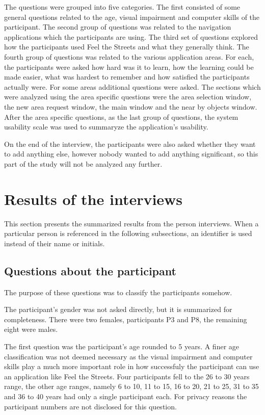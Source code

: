 \documentclass[nolof,digital]{fithesis3}
\begin{document}
The questions were grouped into five categories. The first consisted of some general questions related to the age, visual impairment and computer skills of the participant. The second group of questions was related to the navigation applications which the participants are using. The third set of questions explored how the participants used Feel the Streets and what they generally think. The fourth group of questions was related to the various application areas. For each, the participants were asked how hard was it to learn, how the learning could be made easier, what was hardest to remember and how satisfied the participants actually were. For some areas additional questions were asked. The sections which were analyzed using the area specific questions were the area selection window, the new area request window, the main window and the near by objects window. After the area specific questions, as the last group of questions, the system usability scale \parencite{brooke1996} was used to summaryze the application's usability.

On the end of the interview, the participants were also asked whether they want to add anything else, however nobody wanted to add anything significant, so this part of the study will not be analyzed any further.
\section{Results of the interviews}
This section presents the summarized results from the person interviews. When a particular person is referenced in the following subsections, an identifier is used instead of their name or initials.
\subsection{Questions about the participant}
The purpose of these questions was to classify the participants somehow.

The participant's gender was not asked directly, but it is summarized for completeness. There were two females, participants P3 and P8, the remaining eight were males.

The first question was the participant's age rounded to 5 years. A finer age classification was not deemed necessary as the visual impairment and computer skills play a much more important role in how successfuly the participant can use an application like Feel the Streets. Four participants fell to the 26 to 30 years range, the other age ranges, namely 6 to 10, 11 to 15, 16 to 20, 21 to 25, 31 to 35 and 36 to 40 years had only a single participant each. For privacy reasons the participant numbers are not disclosed for this question.
\end{document}
